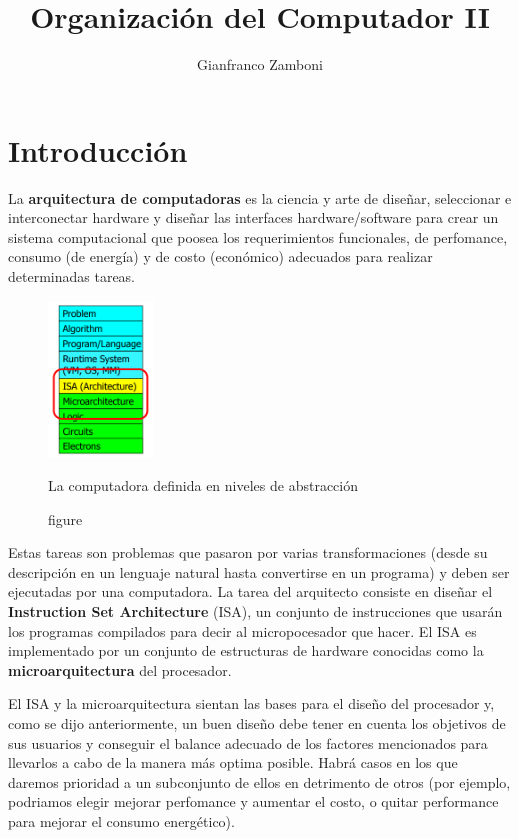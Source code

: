 

\title{Organización del Computador II}
\author{Gianfranco Zamboni}



\newcommand{\red}[1]{{\color{red}#1}}  			%

	\maketitle
	\tableofcontents
	\newpage

\section{Introducción}

La \textbf{arquitectura de computadoras} es la ciencia y arte de diseñar, seleccionar e interconectar hardware y diseñar las interfaces hardware/software para crear un sistema computacional que poosea los requerimientos funcionales, de perfomance, consumo (de energía) y de costo (económico) adecuados para realizar determinadas tareas.

\begin{figure}
	\centering
	\includegraphics[width=0.25\textwidth]{imagenes/arquitectura}
	\caption{figure}{La computadora definida en niveles de abstracción}
	\label{fig:intro::arquitectura}
\end{figure}

Estas tareas son problemas que pasaron por varias transformaciones (desde su descripción en un lenguaje natural hasta convertirse en un programa) y deben ser ejecutadas por una computadora. La tarea del arquitecto consiste en diseñar el \textbf{Instruction Set Architecture} (ISA), un conjunto de instrucciones que usarán los programas compilados para decir al micropocesador que hacer. El ISA es implementado por un conjunto de estructuras de hardware conocidas como la \textbf{microarquitectura} del procesador.

El ISA y la microarquitectura sientan las bases para el diseño del procesador y, como se dijo anteriormente, un buen diseño debe tener en cuenta los objetivos de sus usuarios y conseguir el balance adecuado de los factores mencionados para llevarlos a cabo de la manera más optima posible. Habrá casos en los que daremos prioridad a un subconjunto de ellos en detrimento de otros (por ejemplo, podriamos elegir mejorar perfomance y aumentar el costo, o quitar performance para mejorar el consumo energético).

